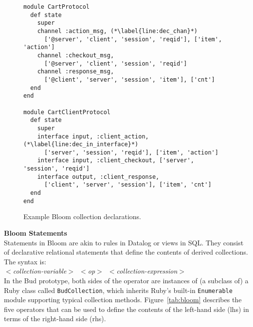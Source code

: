 \begin{figure}[t]
\begin{scriptsize}
\begin{lstlisting}
module CartProtocol
  def state
    super
    channel :action_msg, (*\label{line:dec_chan}*)
      ['@server', 'client', 'session', 'reqid'], ['item', 'action']
    channel :checkout_msg,
      ['@server', 'client', 'session', 'reqid']
    channel :response_msg,
      ['@client', 'server', 'session', 'item'], ['cnt']
  end
end

module CartClientProtocol
  def state
    super
    interface input, :client_action, (*\label{line:dec_in_interface}*)
      ['server', 'session', 'reqid'], ['item', 'action'] 
    interface input, :client_checkout, ['server', 'session', 'reqid']
    interface output, :client_response, 
      ['client', 'server', 'session'], ['item', 'cnt']
  end
end
\end{lstlisting}
\vspace{-10pt}
\caption{Example Bloom collection declarations.}
\label{fig:declarations}
\end{scriptsize}
\vspace{-2pt}
\end{figure}

\vspace{9pt}\noindent \textbf{Bloom Statements}\\
Statements in Bloom are akin to rules in Datalog or views in SQL.  They consist
of declarative relational statements that define the contents of derived
collections.  The syntax is:\\ \noindent
\mbox{\hspace{0.25in}\emph{$<$collection-variable$>$ $<$op$>$
$<$collection-expression$>$}}\\ \noindent In the Bud prototype, both sides of
the operator are instances of (a subclass of) a Ruby class called
\texttt{BudCollection}, which inherits Ruby's built-in \texttt{Enumerable}
module supporting typical collection methods.  Figure~\ref{tab:bloom} describes
the five operators that can be used to define the contents of the left-hand
side (lhs) in terms of the right-hand side (rhs).

